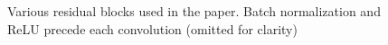 \documentclass{bmvc2k}
\begin{document}
\begin{figure}
  \caption{Various residual blocks used in the paper. Batch normalization and ReLU precede each convolution (omitted for clarity)}
  \vspace{-0.4cm}
  \label{fig:blocks}
\end{figure}
\end{document}
